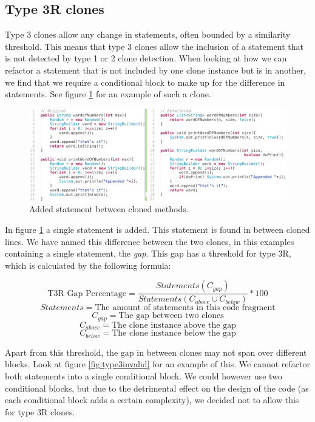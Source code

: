 \subsection{Type 3R clones}\label{sec:type3r}
Type 3 clones allow any change in statements, often bounded by a similarity threshold. This means that type 3 clones allow the inclusion of a statement that is not detected by type 1 or 2 clone detection. When looking at how we can refactor a statement that is not included by one clone instance but is in another, we find that we require a conditional block to make up for the difference in statements. See figure \ref{fig:type3} for an example of such a clone.

\begin{figure}[H]
  \centering
  \includegraphics[width=1\columnwidth]{img/type3_3}
  \caption{Added statement between cloned methods.}
  \label{fig:type3}
\end{figure}

In figure \ref{fig:type3} a single statement is added. This statement is found in between cloned lines. We have named this difference between the two clones, in this examples containing a single statement, the \textit{gap}. This gap has a threshold for type 3R, which is calculated by the following formula:

\begin{eqfloat}\label{eq:type3r}
$$\text{T3R Gap Percentage}=\frac{Statements(C_{gap})}{Statements(C_{above} \cup C_{below})}*100$$
$$Statements = \text{The amount of statements in this code fragment}$$
$$C_{gap} = \text{The gap between two clones}$$
$$C_{above} = \text{The clone instance above the gap}$$
$$C_{below} = \text{The clone instance below the gap}$$
\caption{Type 3R clone merge opportunities threshold formula}\end{eqfloat}

Apart from this threshold, the gap in between clones may not span over different blocks. Look at figure \ref{fig:type3invalid} for an example of this. We cannot refactor both statements into a single conditional block. We could however use two conditional blocks, but due to the detrimental effect on the design of the code (as each conditional block adds a certain complexity), we decided not to allow this for type 3R clones.

